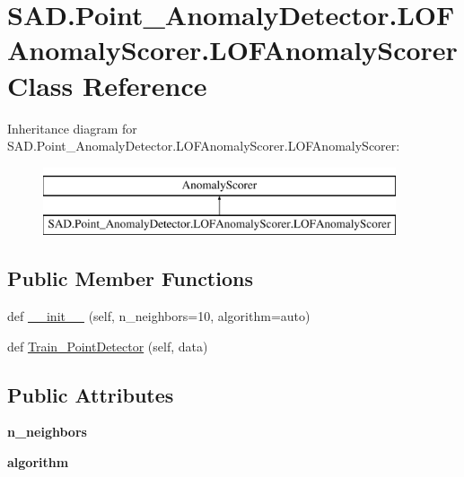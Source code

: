 \hypertarget{classSAD_1_1Point__AnomalyDetector_1_1LOFAnomalyScorer_1_1LOFAnomalyScorer}{}\section{S\+A\+D.\+Point\+\_\+\+Anomaly\+Detector.\+L\+O\+F\+Anomaly\+Scorer.\+L\+O\+F\+Anomaly\+Scorer Class Reference}
\label{classSAD_1_1Point__AnomalyDetector_1_1LOFAnomalyScorer_1_1LOFAnomalyScorer}
Inheritance diagram for S\+A\+D.\+Point\+\_\+\+Anomaly\+Detector.\+L\+O\+F\+Anomaly\+Scorer.\+L\+O\+F\+Anomaly\+Scorer\+:\begin{figure}[H]
\begin{center}
\leavevmode
\includegraphics[height=2.000000cm]{classSAD_1_1Point__AnomalyDetector_1_1LOFAnomalyScorer_1_1LOFAnomalyScorer}
\end{center}
\end{figure}
\subsection*{Public Member Functions}
\begin{DoxyCompactItemize}
\item 
def \hyperlink{classSAD_1_1Point__AnomalyDetector_1_1LOFAnomalyScorer_1_1LOFAnomalyScorer_a901c20153f333b511bcfae6fb1c997a3}{\+\_\+\+\_\+init\+\_\+\+\_\+} (self, n\+\_\+neighbors=10, algorithm=\textquotesingle{}auto\textquotesingle{})
\item 
def \hyperlink{classSAD_1_1Point__AnomalyDetector_1_1LOFAnomalyScorer_1_1LOFAnomalyScorer_a1d4a77f8866cca6ed19db1f92ae13fd0}{Train\+\_\+\+Point\+Detector} (self, data)
\end{DoxyCompactItemize}
\subsection*{Public Attributes}
\begin{DoxyCompactItemize}
\item 
{\bfseries n\+\_\+neighbors}\hypertarget{classSAD_1_1Point__AnomalyDetector_1_1LOFAnomalyScorer_1_1LOFAnomalyScorer_a25f6111d8c73e8e3dcac7009a27cf762}{}\label{classSAD_1_1Point__AnomalyDetector_1_1LOFAnomalyScorer_1_1LOFAnomalyScorer_a25f6111d8c73e8e3dcac7009a27cf762}

\item 
{\bfseries algorithm}\hypertarget{classSAD_1_1Point__AnomalyDetector_1_1LOFAnomalyScorer_1_1LOFAnomalyScorer_a60c856f4087c27a2048e1afe93f96193}{}\label{classSAD_1_1Point__AnomalyDetector_1_1LOFAnomalyScorer_1_1LOFAnomalyScorer_a60c856f4087c27a2048e1afe93f96193}

\end{DoxyCompactItemize}


